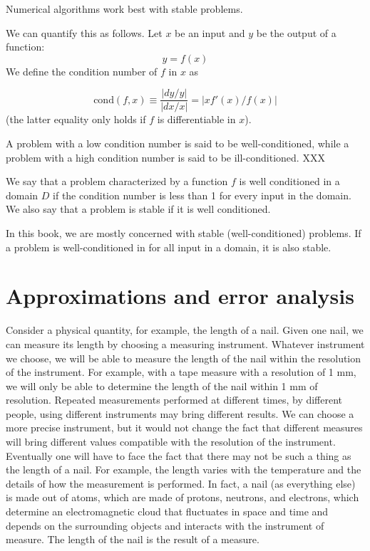 \documentclass[justified, sixbynine]{tufte-book}
\def\func{\textrm}
\theoremstyle{plain}%
\newtheorem * {corollary}{Corollary}
\theoremstyle{definition}
\theoremstyle{remark}
\newtheorem * {remark}{Remark}
\newtheorem * {note}{Note}
\begin{document}
\begin{fullwidth}
Numerical algorithms work best with stable problems.

We can quantify this as follows. Let $x$ be an input and $y$ be the output of a function:
\begin{equation}
y = f(x)
\end{equation}
We define the condition number of $f$ in $x$ as


\begin{equation}
\func{cond}(f, x) \equiv \frac{|dy/y|}{|dx/x|} = |x f'(x)/f(x)|
\end{equation}
(the latter equality only holds if $f$ is differentiable in $x$).

A problem with a low condition number is said to be well-conditioned, while a problem with a high condition number is said to be ill-conditioned. XXX

We say that a problem characterized by a function $f$ is well conditioned in a domain $D$ if the condition number is less than 1 for every input in the domain. We also say that a problem is stable if it is well conditioned.

In this book, we are mostly concerned with stable (well-conditioned) problems. If a problem is well-conditioned in for all input in a domain, it is also stable.


\goodbreak\section{Approximations and error analysis}


Consider a physical quantity, for example, the length of a nail. Given one nail, we can measure its length by choosing a measuring instrument. Whatever instrument we choose, we will be able to measure the length of the nail within the resolution of the instrument. For example, with a tape measure with a resolution of 1 mm, we will only be able to determine the length of the nail within 1 mm of resolution. Repeated measurements performed at different times, by different people, using different instruments may bring different results. We can choose a more precise instrument, but it would not change the fact that different measures will bring different values compatible with the resolution of the instrument. Eventually one will have to face the fact that there may not be such a thing as the length of a nail. For example, the length varies with the temperature and the details of how the measurement is performed. In fact, a nail (as everything else) is made out of atoms, which are made of protons, neutrons, and electrons, which determine an electromagnetic cloud that fluctuates in space and time and depends on the surrounding objects and interacts with the instrument of measure. The length of the nail is the result of a measure.


\end{fullwidth}
\end{document}
